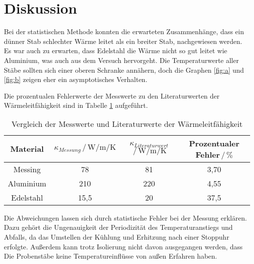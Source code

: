 \section{Diskussion}
\label{sec:Diskussion}

Bei der statistischen Methode konnten die erwarteten Zusammenhänge, dass
ein dünner Stab schlechter Wärme leitet als ein breiter Stab, nachgewiesen werden.
Es war auch zu erwarten, dass Edelstahl die Wärme nicht so gut leitet
wie Aluminium, was auch aus dem Versuch hervorgeht. Die Temperaturwerte aller Stäbe sollten sich einer
oberen Schranke annähern, doch die Graphen \ref{fig:a} und \ref{fig:b} zeigen eher ein asymptotisches 
Verhalten.

\noindent Die prozentualen Fehlerwerte der Messwerte zu den Literaturwerten der Wärmeleitfähigkeit sind in Tabelle \ref{tab:diskussion} aufgeführt.


\begin{table}[H]
\normalsize

\centering
{}
\begin{tabular}{c c c c}
\toprule
        Material & $\kappa_{Messung} \,/\, \si{\watt\per\meter\per\kelvin}$ & $ \kappa_{Literaturwert} $\cite{schweiz}$\,/\, \si{\watt\per\meter\per\kelvin}$ & Prozentualer Fehler$\,/\, \% $\\
        \midrule
        Messing      &   78   &   81   &   3,70\\
        Aluminium   &   210   &   220   &    4,55\\
        Edelstahl     &   15,5   &   20   &   37,5\\

\bottomrule

\end{tabular}

\caption{Vergleich der Messwerte und Literaturwerte der Wärmeleitfähigkeit}
\label{tab:diskussion}
\end{table}

\noindent Die Abweichungen lassen sich durch statistische Fehler bei der Messung erklären.
Dazu gehört die Ungenauigkeit der Periodizität des Temperaturanstiegs und Abfalls, da
das Umstellen der Kühlung und Erhitzung nach einer Stoppuhr erfolgte.
Außerdem kann trotz Isolierung nicht davon ausgegangen werden, dass Die Probenstäbe keine Temperatureinflüsse von außen Erfahren haben. 